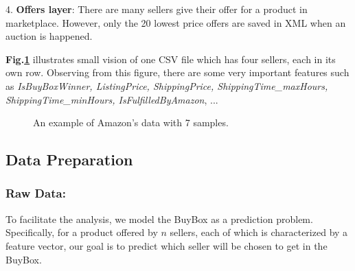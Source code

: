 4. \textbf{Offers layer}: There are many  sellers give their offer for a product in marketplace. However, only the 20 lowest price offers are saved in XML when an auction is happened.


\textbf{Fig.\ref{fig:exampleCSV}} illustrates small vision of one CSV file
which has four sellers, each in its own row. Observing from this figure, there are some very important features such as \textit{IsBuyBoxWinner, ListingPrice, ShippingPrice, ShippingTime\_maxHours, ShippingTime\_minHours, IsFulfilledByAmazon}, ... 

\begin{figure}[!h]
	\begin{center}
	\end{center}
	\caption{\label{fig:exampleCSV}An example of Amazon's data with 7 samples.}
\end{figure}

\subsection{Data Preparation}
\label{sec:dataprepare}

\subsubsection{Raw Data:}
\label{sec:datacsv}
To facilitate the analysis, we model the BuyBox as a prediction problem. Specifically, for a product offered by $n$ sellers, each of which is characterized by a feature vector, our goal is to predict which seller will be chosen to get in the BuyBox. 

